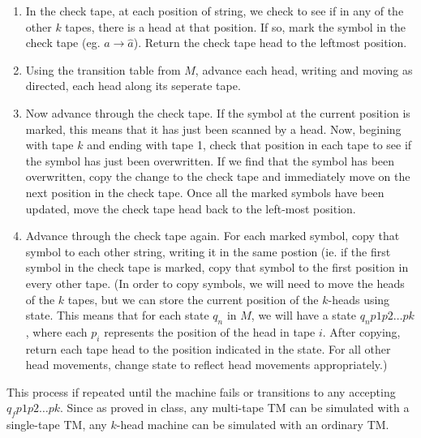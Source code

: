 \documentclass[a4paper]{article}
\begin{document}
\begin{enumerate}
\begin{enumerate}[i]
\item In the check tape, at each position of string, we check to see if in any of the other $k$ tapes, there is a head at that position. If so, mark the symbol in the check tape (eg. $a \to \hat{a}$). Return the check tape head to the leftmost position.
\item Using the transition table from $M$, advance each head, writing and moving as directed, each head along its seperate tape.
\item Now advance through the check tape. If the symbol at the current position is marked, this means that it has just been scanned by a head. Now, begining with tape $k$ and ending with tape 1, check that position in each tape to see if the symbol has just been overwritten. If we find that the symbol has been overwritten, copy the change to the check tape and immediately move on the next position in the check tape. Once all the marked symbols have been updated, move the check tape head back to the left-most position.
\item Advance through the check tape again. For each marked symbol, copy that symbol to each other string, writing it in the same postion (ie. if the first symbol in the check tape is marked, copy that symbol to the first position in every other tape. (In order to copy symbols, we will need to move the heads of the $k$ tapes, but we can store the current position of the $k$-heads using state. This means that for each state $q_n$ in $M$, we will have a state $q_n{p1p2\dots pk}$, where each $p_i$ represents the position of the head in tape $i$. After copying, return each tape head to the position indicated in the state. For all other head movements, change state to reflect head movements appropriately.) \\
\end{enumerate}
This process if repeated until the machine fails or transitions to any accepting $q_f{p1p2\dots pk}$. 
Since as proved in class, any multi-tape TM can be simulated with a single-tape TM, any $k$-head machine can be simulated with an ordinary TM.





\end{enumerate}
\end{document}
